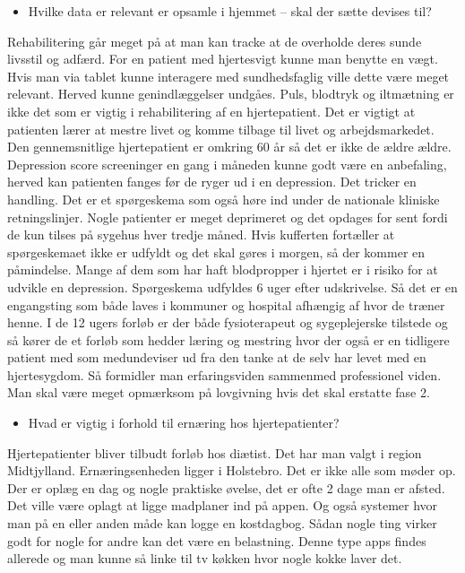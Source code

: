 \begin{itemize}
	\item Hvilke data er relevant er opsamle i hjemmet – skal der sætte devises til? 
\end{itemize} 
Rehabilitering går meget på at man kan tracke at de overholde deres sunde livsstil og adfærd. For en patient med hjertesvigt kunne man benytte en vægt. Hvis man via tablet kunne interagere med sundhedsfaglig ville dette være meget relevant. Herved kunne genindlæggelser undgåes. Puls, blodtryk og iltmætning er ikke det som er vigtig i rehabilitering af en hjertepatient. Det er vigtigt at patienten lærer at mestre livet og komme tilbage til livet og arbejdsmarkedet. Den gennemsnitlige hjertepatient er omkring 60 år så det er ikke de ældre ældre. Depression score screeninger en gang i måneden kunne godt være en anbefaling, herved kan patienten fanges før de ryger ud i en depression. Det tricker en handling. Det er et spørgeskema som også høre ind under de nationale kliniske retningslinjer. Nogle patienter er meget deprimeret og det opdages for sent fordi de kun tilses på sygehus hver tredje måned. Hvis kufferten fortæller at spørgeskemaet ikke er udfyldt og det skal gøres i morgen, så der kommer en påmindelse. Mange af dem som har haft blodpropper i hjertet er i risiko for at udvikle en depression. Spørgeskema udfyldes 6 uger efter udskrivelse. Så det er en engangsting som både laves i kommuner og hospital afhængig af hvor de træner henne. I de 12 ugers forløb er der både fysioterapeut og sygeplejerske tilstede og så kører de et forløb som hedder læring og mestring hvor der også er en tidligere patient med som medundeviser ud fra den tanke at de selv har levet med en hjertesygdom. Så formidler man erfaringsviden sammenmed professionel viden. Man skal være meget opmærksom på lovgivning hvis det skal erstatte fase 2. 

\begin{itemize}
	\item Hvad er vigtig i forhold til ernæring hos hjertepatienter? 
\end{itemize} 
Hjertepatienter bliver tilbudt forløb hos diætist. Det har man valgt i region Midtjylland. Ernæringsenheden ligger i Holstebro. Det er ikke alle som møder op. Der er oplæg en dag og nogle praktiske øvelse, det er ofte 2 dage man er afsted. Det ville være oplagt at ligge madplaner ind på appen. Og også systemer hvor man på en eller anden måde kan logge en kostdagbog. Sådan nogle ting virker godt for nogle for andre kan det være en belastning. Denne type apps findes allerede og man kunne så linke til tv køkken hvor nogle kokke laver det. 

